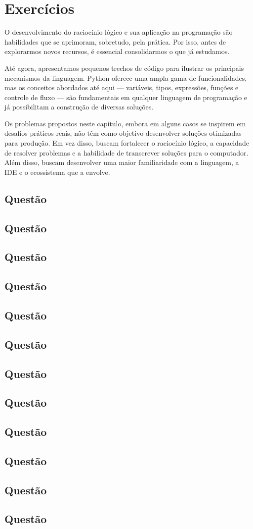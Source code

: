 \chapter{Exercícios}

O desenvolvimento do raciocínio lógico e sua aplicação na programação são habilidades que se aprimoram, sobretudo, pela
prática.
Por isso, antes de explorarmos novos recursos, é essencial consolidarmos o que já estudamos.

Até agora, apresentamos pequenos trechos de código para ilustrar os principais mecanismos da linguagem.
Python oferece uma ampla gama de funcionalidades, mas os conceitos abordados até aqui --- variáveis, tipos, expressões,
funções e controle de fluxo --- são fundamentais em qualquer linguagem de programação e já possibilitam a construção de
diversas soluções.

Os problemas propostos neste capítulo, embora em alguns casos se inspirem em desafios práticos reais, não têm como
objetivo desenvolver soluções otimizadas para produção.
Em vez disso, buscam fortalecer o raciocínio lógico, a capacidade de resolver problemas e a habilidade de transcrever
soluções para o computador.
Além disso, buscam desenvolver uma maior familiaridade com a linguagem, a IDE e o ecossistema que a envolve.

\newcommand{\questao}[2][]{\addtocounter{section}{1}\section*{Questão \thesection} }

\newcommand{\expath}{capitulos/ex/}

\questao[\expath]{desvio_padrao}
\questao[\expath]{login}
\questao[\expath]{bussola}
\questao[\expath]{separa_pares_impares}
\questao[\expath]{seno}
\questao[\expath]{produto_mais_vendido}
\questao[\expath]{alunos_aprovados}
\questao[\expath]{media_movel}
\questao[\expath]{ordena}
\questao[\expath]{procura}
\questao[\expath]{tictactoe}
\questao[\expath]{tictactoe2}

